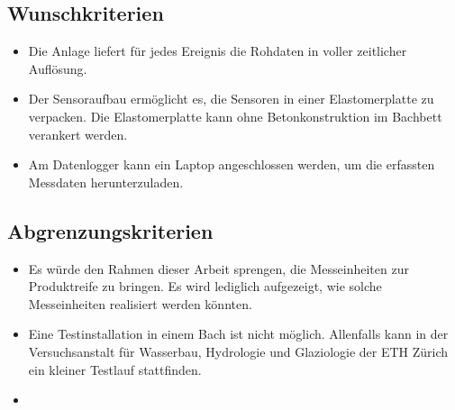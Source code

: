 \subsection{Wunschkriterien}
\begin{itemize}
\item Die Anlage liefert für jedes Ereignis die Rohdaten in voller zeitlicher Auflösung.
\item Der Sensoraufbau ermöglicht es, die Sensoren in einer Elastomerplatte zu verpacken. Die Elastomerplatte kann ohne Betonkonstruktion im Bachbett verankert werden.
\item Am Datenlogger kann ein Laptop angeschlossen werden, um die erfassten Messdaten herunterzuladen.
\end{itemize}
\subsection{Abgrenzungskriterien}
\begin{itemize}
\item Es würde den Rahmen dieser Arbeit sprengen, die Messeinheiten zur Produktreife zu bringen. Es wird lediglich aufgezeigt, wie solche Messeinheiten realisiert werden könnten.
\item Eine Testinstallation in einem Bach ist nicht möglich. Allenfalls kann in der Versuchsanstalt für Wasserbau, Hydrologie und Glaziologie der ETH Zürich ein kleiner Testlauf stattfinden.
\item
\end{itemize}
